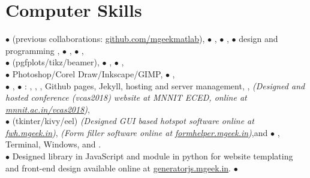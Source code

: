 \vspace{-2.5em}
\section{Computer Skills}
{\scriptsize$\bullet$}  (previous collaborations: \href{https://github.com/mgeekmatlab}{github.com/mgeekmatlab}), {\scriptsize$\bullet$} , {\scriptsize$\bullet$} , {\scriptsize$\bullet$}  design and programming , {\scriptsize$\bullet$} , {\scriptsize$\bullet$} ,\\ 
{\scriptsize$\bullet$}  (pgfplots/tikz/beamer), {\scriptsize$\bullet$} , {\scriptsize$\bullet$} ,\\
{\scriptsize$\bullet$} Photoshop/Corel Draw/Inkscape/GIMP, {\scriptsize$\bullet$} , \\
{\scriptsize$\bullet$} , {\scriptsize$\bullet$} : , , , Github pages, Jekyll, hosting and server management, ,  \emph{(Designed and hosted conference (vcas2018) website at MNNIT ECED, online at \href{http://mnnit.ac.in/vcas2018}{mnnit.ac.in/vcas2018})}, \\
{\scriptsize$\bullet$}  (tkinter/kivy/eel) \emph{(Designed GUI based hotspot software online at \href{https://fwh.mgeek.in}{fwh.mgeek.in})}, \emph{(Form filler software online at \href{https://formhelper.mgeek.in}{formhelper.mgeek.in})},and {\scriptsize$\bullet$} , Terminal, Windows, and .\\ {\scriptsize$\bullet$} Designed  library in JavaScript and  module in python for website templating and front-end design available online at \href{https://generatorjs.mgeek.in}{generatorjs.mgeek.in}. {\scriptsize$\bullet$} \\
\vspace{-1em}
\sectionline